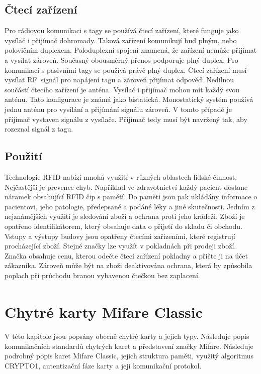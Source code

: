 \section{Čtecí zařízení}
Pro rádiovou komunikaci s tagy se používá čtecí zařízení, které funguje jako vysílač i přijímač dohromady. Taková zařízení komunikují buď plným, nebo polovičním duplexem. Poloduplexní spojení znamená, že zařízení nemůže přijímat a vysílat zároveň. Současný obousměrný přenos podporuje plný duplex. Pro komunikaci s pasivními tagy se používá právě plný duplex. Čtecí zařízení musí vysílat RF~signál pro napájení tagu a zároveň přijímat odpověď.
Nedílnou součástí čtecího zařízení je anténa. Vysílač i přijímač mohou mít každý svou anténu. Tato konfigurace je známá jako bistatická. Monostatický systém používá jednu anténu pro vysílání a přijímání signálu zároveň. V tomto případě je příjímač vystaven signálu z vysílače. Přijímač tedy musí být navržený tak, aby rozeznal signál z tagu\cite{The_RF_in_RFID}.\par

\section{Použití}
Technologie RFID nabízí mnohá využití v různých oblastech lidské činnost. Nejčastější je prevence chyb. Například ve zdravotnictví každý pacient dostane náramek obsahující RFID čip s pamětí. Do paměti jsou pak ukládány informace o pacientovi, jeho patologie, předepsané a podáné léky a jiné skutečnosti. Jedním z nejznámějších využití je sledování zboží a ochrana proti jeho krádeži. Zboží je opatřeno identifikátorem, který obsahuje data o přijetí do skladu či obchodu. Vstupy a výstupy budovy jsou opatřeny čtecími zařizeními, které registrují procházející zboží. Stejné značky lze využít v pokladnách při prodeji zboží. Značka obsahuje cenu, kterou odečte čtecí zařízení pokladny a přičte ji na účet zákazníka. Zároveň může být na zboži deaktivována ochrana, která by způsobila poplach při průchodu branou vybavenou čtečkou bez zaplacení.\cite{BezpecnostRfid}\par

\chapter{Chytré karty Mifare Classic\textsuperscript{\textregistered}}
\label{chytre_karty}
V této kapitole jsou popsány obecně chytré karty a jejich typy. Následuje popis komunikačních standardů chytrých karet a představení značky Mifare. Následuje podrobný popis karet Mifare Classic, jejich struktura paměti, využitý algoritmus CRYPTO1, autentizační fáze karty a její komunikační protokol.

